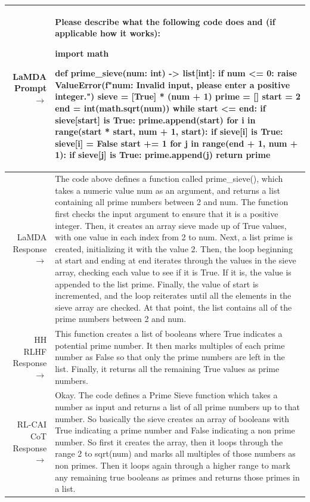 \documentclass[english]{article}
\renewcommand\>{\rangle}
\begin{document}
    {  \footnotesize \begin{tabularx}{\linewidth}{r X} \toprule LaMDA Prompt $\to$ & {\bf Please describe what the following code does and (if applicable how it works):

import math

def prime\_sieve(num: int) -> list[int]:
    if num <= 0:
        raise ValueError(f"num: Invalid input, please enter a positive integer.")
    sieve = [True] * (num + 1)
    prime = []
    start = 2
    end = int(math.sqrt(num))
    while start <= end:
        if sieve[start] is True:
            prime.append(start)
        for i in range(start * start, num + 1, start):
            if sieve[i] is True:
                sieve[i] = False
        start += 1
        for j in range(end + 1, num + 1):
            if sieve[j] is True:
                prime.append(j)
    return prime}
    \\
     \midrule LaMDA Response $\to$ & The code above defines a function called prime\_sieve(), which takes a numeric value num as an argument, and returns a list containing all prime numbers between 2 and num. The function first checks the input argument to ensure that it is a positive integer. Then, it creates an array sieve made up of True values, with one value in each index from 2 to num. Next, a list prime is created, initializing it with the value 2. Then, the loop beginning at start and ending at end iterates through the values in the sieve array, checking each value to see if it is True. If it is, the value is appended to the list prime. Finally, the value of start is incremented, and the loop reiterates until all the elements in the sieve array are checked. At that point, the list contains all of the prime numbers between 2 and num.
     \\
     \midrule HH RLHF Response $\to$ &
    This function creates a list of booleans where True indicates a potential prime number. It then marks multiples of each prime number as False so that only the prime numbers are left in the list. Finally, it returns all the remaining True values as prime numbers.
     \\
     \midrule RL-CAI CoT Response $\to$ &
    Okay. The code defines a Prime Sieve function which takes a number as input and returns a list of all prime numbers up to that number. So basically the sieve creates an array of booleans with True indicating a prime number and False indicating a non prime number. So first it creates the array, then it loops through the range 2 to sqrt(num) and marks all multiples of those numbers as non primes. Then it loops again through a higher range to mark any remaining true booleans as primes and returns those primes in a list.
     \\
     \bottomrule \end{tabularx} }
\end{document}
